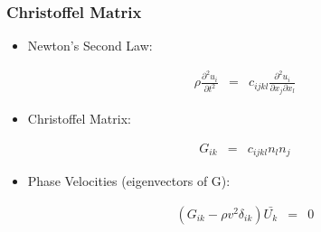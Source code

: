 \documentclass{beamer}
\begin{document}
\begin{frame}
\frametitle{Christoffel Matrix}

\begin{itemize}

\pause \item
Newton's Second Law:

\begin{eqnarray}
\rho \frac{\partial^2 u_i}{\partial t^2} &=& c_{ijkl} \frac{\partial^2 u_i}{\partial x_j \partial x_l} \nonumber
\end{eqnarray}

\pause \item
Christoffel Matrix:

\begin{eqnarray}
G_{ik} &=& c_{ijkl} n_l n_j \nonumber
\end{eqnarray}

\pause \item
Phase Velocities (eigenvectors of G):

\begin{eqnarray}
(G_{ik}-\rho v^2 \delta_{ik} ) \bar{U_k} &=& 0 \nonumber
\end{eqnarray}

\end{itemize}

\end{frame}
\end{document}
